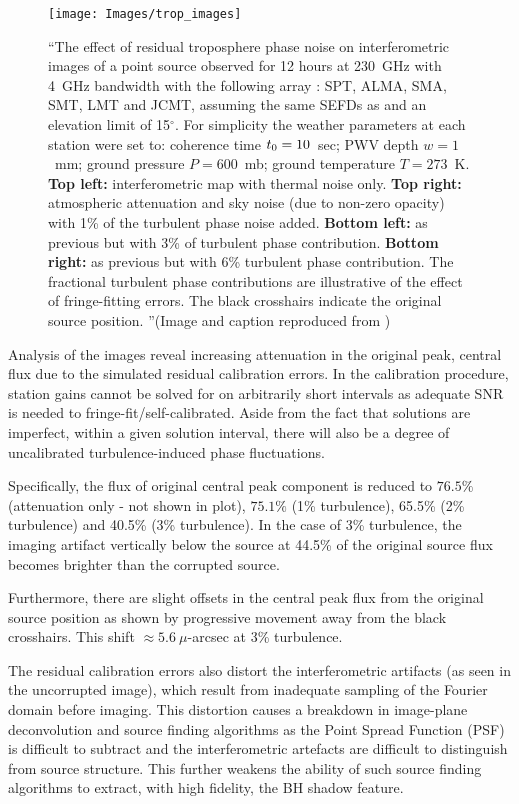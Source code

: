 \begin{figure}[h!]
\texttt{[image: Images/trop\_images]}
\caption{``The effect of residual troposphere phase noise on interferometric images of a point source observed for 12 hours at 230~GHz with 4~GHz bandwidth with the following array : SPT, ALMA, SMA, SMT, LMT and JCMT, assuming the same SEFDs as \protect\citet{Lu_2014} and an elevation limit of 15$^\circ$. For simplicity the weather parameters at each station were set to: coherence time $t_{\rm 0}=10$~sec; PWV depth $w=1$~mm; ground pressure $P=600$~mb; ground temperature $T =273$~K. {\bf Top left:} interferometric map with thermal noise only. {\bf Top right:} atmospheric attenuation and sky noise (due to non-zero opacity) with 1\% of the turbulent phase noise added. {\bf Bottom left:} as previous but with 3\% of turbulent phase contribution. {\bf Bottom right:} as previous but with 6\% turbulent phase contribution. The fractional turbulent phase contributions are illustrative of the effect of fringe-fitting errors. The black crosshairs indicate the original source position. ''(Image and caption reproduced from \citet{Blecher_2016}) \label{fig:trop_images}%
}
\end{figure}


Analysis of the images reveal increasing attenuation in the original peak, central flux due to the simulated residual calibration errors. In the calibration procedure, station gains cannot be solved for on arbitrarily short intervals as adequate SNR is needed to fringe-fit/self-calibrated. Aside from the fact that solutions are imperfect, within a given solution interval, there will also be a degree of uncalibrated turbulence-induced phase fluctuations.

Specifically, the flux of original central peak component is reduced to $76.5\%$ (attenuation only - not shown in plot), $75.1\%$ (1\% turbulence), 65.5\% (2\% turbulence) and  40.5\% (3\% turbulence). In the case of 3\% turbulence, the imaging artifact vertically below the source at 44.5\% of the original source flux becomes brighter than the corrupted source. 


Furthermore, there are slight offsets in the central peak flux from the original source position as shown by progressive movement away from the black crosshairs. This shift $\approx 5.6\ \mu$-arcsec at 3\% turbulence. 


The residual calibration errors also distort the interferometric artifacts (as seen in the uncorrupted image), which result from inadequate sampling of the Fourier domain before imaging. This distortion causes a breakdown in image-plane deconvolution and source finding algorithms as the Point Spread Function (PSF) is difficult to subtract and the interferometric artefacts are difficult to distinguish from source structure. This further weakens the ability of such source finding algorithms to extract, with high fidelity, the BH shadow feature.


